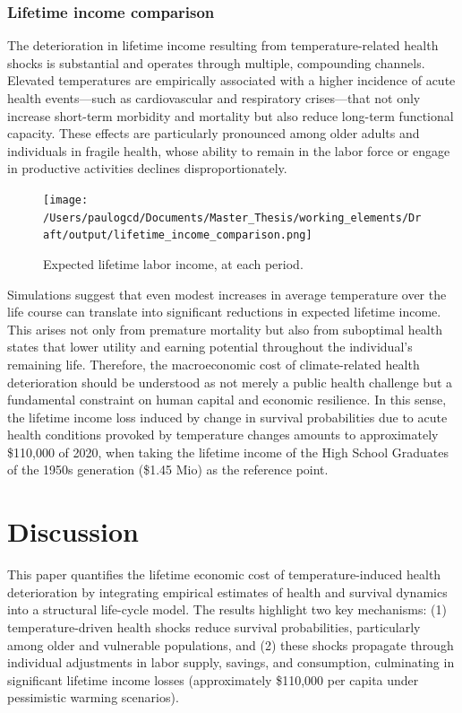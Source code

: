 \documentclass{article}
\begin{document}
\subsubsection{Lifetime income comparison}

The deterioration in lifetime income resulting from temperature-related health shocks is substantial and operates through multiple, compounding channels. Elevated temperatures are empirically associated with a higher incidence of acute health events—such as cardiovascular and respiratory crises—that not only increase short-term morbidity and mortality but also reduce long-term functional capacity. These effects are particularly pronounced among older adults and individuals in fragile health, whose ability to remain in the labor force or engage in productive activities declines disproportionately.

\begin{figure}[H]
    \texttt{[image: /Users/paulogcd/Documents/Master\_Thesis/working\_elements/Draft/output/lifetime\_income\_comparison.png]}
    \caption{Expected lifetime labor income, at each period.}
\end{figure}

Simulations suggest that even modest increases in average temperature over the life course can translate into significant reductions in expected lifetime income.
This arises not only from premature mortality but also from suboptimal health states that lower utility and earning potential throughout the individual’s remaining life. Therefore, the macroeconomic cost of climate-related health deterioration should be understood as not merely a public health challenge but a fundamental constraint on human capital and economic resilience.
In this sense, the lifetime income loss induced by change in survival probabilities due to acute health conditions provoked by temperature changes amounts to approximately \$110,000 of 2020, when taking the lifetime income of the High School Graduates of the 1950s generation (\$1.45 Mio) as the reference point.

\section{Discussion}

This paper quantifies the lifetime economic cost of temperature-induced health deterioration by integrating empirical estimates of health and survival dynamics into a structural life-cycle model. The results highlight two key mechanisms: (1) temperature-driven health shocks reduce survival probabilities, particularly among older and vulnerable populations, and (2) these shocks propagate through individual adjustments in labor supply, savings, and consumption, culminating in significant lifetime income losses (approximately \$110,000 per capita under pessimistic warming scenarios).
\end{document}
